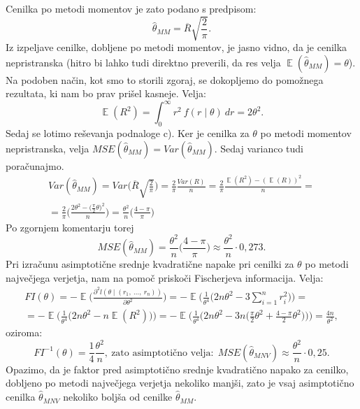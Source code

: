 \documentclass{article}
\DeclareMathOperator{\EX}{\mathbb{E}}
\begin{document}
Cenilka po metodi momentov je zato podano s predpisom:
$$
\hat{\theta}_{MM} = \overline{R} \sqrt{\frac{2}{\pi}}.
$$
Iz izpeljave cenilke, dobljene po metodi momentov, je jasno vidno, da je cenilka nepristranska (hitro bi lahko tudi direktno preverili, da res velja $\EX(\hat{\theta}_{MM}) = \theta$).
\newline
Na podoben način, kot smo to storili zgoraj, se dokopljemo do pomožnega rezultata, ki nam bo prav prišel kasneje. Velja:
$$
\EX(R^2) = \int_{0}^{\infty}{r^2~f(r \mid \theta)~dr}= 2 \theta^2.
$$
\newline
\newline
Sedaj se lotimo reševanja podnaloge c). Ker je cenilka za $\theta$ po metodi momentov nepristranska, velja $MSE(\hat{\theta}_{MM}) = Var(\hat{\theta}_{MM})$. Sedaj varianco tudi poračunajmo.
\begin{equation*}
    \begin{split}
    Var(\hat{\theta}_{MM}) = Var\bigg(\overline{R} \sqrt{\frac{2}{\pi}}\bigg) = \frac{2}{\pi} \frac{Var(R)}{n} = \frac{2}{\pi}\frac{\EX(R^2) - (\EX(R))^2}{n} = \\
    = \frac{2}{\pi}\bigg(\frac{2 \theta^2 - \big(\frac{\pi}{2} \theta\big)^2}{n}\bigg) = \frac{\theta^2}{n} \bigg(\frac{4 - \pi}{\pi}\bigg)
    \end{split}
\end{equation*}
Po zgornjem komentarju torej
$$
MSE(\hat{\theta}_{MM}) = \frac{\theta^2}{n} \bigg(\frac{4 - \pi}{\pi}\bigg)\approx \frac{\theta^2}{n} \cdot 0{,}273.
$$
Pri izračunu asimptotične srednje kvadratične napake pri cenilki za $\theta$ po metodi največjega verjetja, nam na pomoč priskoči Fischerjeva informacija. 
Velja:
\begin{equation*}
    \begin{split}
    FI(\theta) = - \EX\bigg(\frac{\partial^2 l(\theta \mid (r_1,~\dots,~r_n))}{\partial \theta^2}\bigg) = -\EX\bigg(\frac{1}{\theta^4}\bigg(2n\theta^2 - 3 \sum_{i=1}^{n}{r_i^2}\bigg)\bigg) = \\
    = -\EX\bigg(\frac{1}{\theta^4}\bigg(2n \theta^2 - n \EX(R^2)\bigg)\bigg) = -\EX\bigg(\frac{1}{\theta^4}\bigg(2n \theta^2 - 3n \Big(\frac{\pi}{2} \theta^2 + \frac{4- \pi}{2}\theta^2\Big)\bigg)\bigg) = \frac{4n}{\theta^2}, 
    \end{split}
\end{equation*}
oziroma: 
$$ 
    FI^{-1}(\theta) = \frac{1}{4}\frac{\theta^2}{n},~\text{zato asimptotično velja:}~~MSE(\hat{\theta}_{MNV}) \approx \frac{\theta^2}{n} \cdot 0{,}25. 
$$
Opazimo, da je faktor pred asimptotično srednje kvadratično napako za cenilko, dobljeno po metodi največjega verjetja nekoliko manjši, zato je vsaj asimptotično cenilka $\hat{\theta}_{MNV}$ nekoliko boljša od cenilke $\hat{\theta}_{MM}$.
\end{document}
